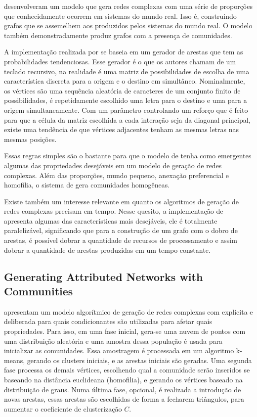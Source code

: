 \documentclass[notes.tex]{subfiles}
\begin{document}
 desenvolveram um modelo que gera redes complexas com uma série de proporções que conhecidamente ocorrem em sistemas do mundo real.
Isso é, construindo grafos que se assemelhem aos produzidos pelos sistemas do mundo real.
O modelo também demonstradamente produz grafos com a presença de comunidades.

A implementação realizada por  se baseia em um gerador de arestas que tem as probabilidades tendenciosas.
Esse gerador é o que os autores chamam de um teclado recursivo, na realidade é uma matriz de possibilidades de escolha de uma característica discreta para a origem e o destino em simultâneo.
Nominalmente, os vértices são uma sequência aleatória de caracteres de um conjunto finito de possibilidades, é repetidamente escolhido uma letra para o destino e uma para a origem simultaneamente.
Com um parâmetro controlando um reforço que é feito para que a célula da matriz escolhida a cada interação seja da diagonal principal, existe uma tendência de que vértices adjacentes tenham as mesmas letras nas mesmas posições.

Essas regras simples são o bastante para que o modelo de  tenha como emergentes algumas das propriedades desejáveis em um modelo de geração de redes complexas.
Além das proporções, mundo pequeno, anexação preferencial e homofilia, o sistema de  gera comunidades homogêneas.

Existe também um interesse relevante em quanto os algoritmos de geração de redes complexas precisam em tempo.
Nesse quesito, a implementação de  apresenta algumas das características mais desejáveis, ele é totalmente paralelizável, significando que para a construção de um grafo com o dobro de arestas, é possível dobrar a quantidade de recursos de processamento e assim dobrar a quantidade de arestas produzidas em um tempo constante.

\subsection{Generating Attributed Networks with Communities}

 apresentam um modelo algorítmico de geração de redes complexas com explícita e deliberada para quais condicionantes são utilizadas para afetar quais propriedades.
Para isso, em uma fase inicial, gera-se uma nuvem de pontos com uma distribuição aleatória e uma amostra dessa população é usada para inicializar as comunidades.
Essa amostragem é processada em um algoritmo k-means, gerando os clusters iniciais, e as arestas iniciais são geradas.
Uma segunda fase processa os demais vértices, escolhendo qual a comunidade serão inseridos se baseando na distância euclideana (homofilia), e gerando os vértices baseado na distribuição de graus.
Numa última fase, opcional, é realizada a introdução de novas arestas, essas arestas são escolhidas de forma a fecharem triângulos, para aumentar o coeficiente de clusterização $C$.
\end{document}
